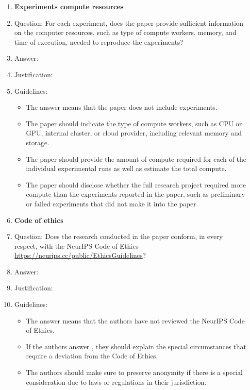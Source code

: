 \begin{enumerate}
\item {\bf Experiments compute resources}
    \item[] Question: For each experiment, does the paper provide sufficient information on the computer resources, such as type of compute workers, memory, and time of execution, needed to reproduce the experiments?
    \item[] Answer: \answerTODO{}
    \item[] Justification: \justificationTODO{}
    \item[] Guidelines:
    \begin{itemize}
        \item The answer \answerNA{} means that the paper does not include experiments.
        \item The paper should indicate the type of compute workers, such as CPU or GPU, internal cluster, or cloud provider, including relevant memory and storage.
        \item The paper should provide the amount of compute required for each of the individual experimental runs as well as estimate the total compute.
        \item The paper should disclose whether the full research project required more compute than the experiments reported in the paper, such as preliminary or failed experiments that did not make it into the paper.
    \end{itemize}

\item {\bf Code of ethics}
    \item[] Question: Does the research conducted in the paper conform, in every respect, with the NeurIPS Code of Ethics \url{https://neurips.cc/public/EthicsGuidelines}?
    \item[] Answer: \answerTODO{}
    \item[] Justification: \justificationTODO{}
    \item[] Guidelines:
    \begin{itemize}
        \item The answer \answerNA{} means that the authors have not reviewed the NeurIPS Code of Ethics.
        \item If the authors answer \answerNo{}, they should explain the special circumstances that require a deviation from the Code of Ethics.
        \item The authors should make sure to preserve anonymity if there is a special consideration due to laws or regulations in their jurisdiction.
    \end{itemize}


\end{enumerate}
